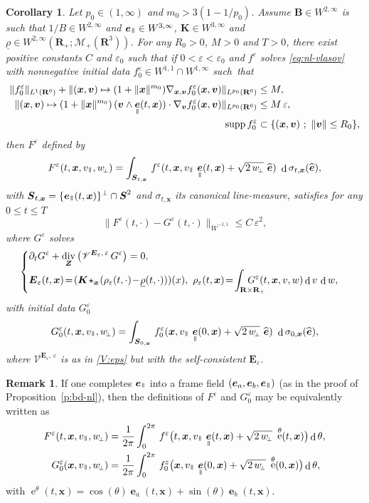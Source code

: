 \documentclass[JEP,XML,SOM,Unicode]{cedram}
\let\mathcal\mathscr
\newenvironment{splitcases}
{\begin{cases}\begin{aligned}}
{\end{aligned}\end{cases}}
\newcommand{\sperp}{{\scriptscriptstyle\perp}}
\newcommand{\sep}{\ ;\ }
\let\eps\varepsilon
\let\d\partial
\DeclareMathOperator\dD{d}\let\dd\dD
\DeclareMathOperator\eD{e}
\DeclareMathOperator{\Div}{div}
\theoremstyle{plain}
\newtheorem{corollary}[theorem]{Corollary}
\theoremstyle{definition}
\newtheorem{remark}[theorem]{Remark}
\newcommand\br{\begin{remark}}
\newcommand\er{\end{remark}}
\newcommand{\be}{\begin{equation}}
\newcommand{\ee}{\end{equation}}
\newcommand{\bc}{\begin{corollary}}
\newcommand{\ec}{\end{corollary}}
\newcommand\R{\mathbf R}
\newcommand\bB{{\boldsymbol B}}
\newcommand\bE{{\boldsymbol E}}
\newcommand\bK{{\boldsymbol K}}
\newcommand\bS{{\boldsymbol S}}
\newcommand\bfv{{\boldsymbol v}}
\newcommand\bfx{{\boldsymbol x}}
\newcommand\bfZ{{\boldsymbol Z}}
\newcommand\urho{{\underline \rho}}
\newcommand\cM{{\mathcal M}}
\newcommand\cV{{\mathcal V}}
\DeclareMathOperator{\beD}{\boldsymbol{e}}
\newcommand\eDpar{\beD_\mypar}
\newcommand\eDa{\beD_a}
\newcommand\eDb{\beD_b}
\newcommand\eperp{w_{\!\sperp}}
\newcommand{\mypar}{{\mkern3mu\vphantom{\perp}\vrule depth 0pt\mkern2mu\vrule depth 0pt\mkern3mu}}
\begin{document}
\bc
\label{cor:2-nl}
Let $p_0\in(1,\infty)$ and $m_0>3(1-1/p_0)$.
Assume $\bB\in W^{2,\infty}$ is such that $1/B\in W^{2,\infty}$ and $\eDpar\in W^{3,\infty}$, $\bK\in W^{3,\infty}$ and $\urho\in W^{2,\infty}(\R_+;\cM_+(\R^3))$. For any $R_0>0$, $M>0$ and $T>0$, there exist positive constants $C$ and $\eps_0$ such that if $0<\eps<\eps_0$ and $f^\eps$ solves \eqref{eq:nl-vlasov} with nonnegative initial data $f_0^\eps\in W^{1,1}\cap W^{1,\infty}$ such~that
\begin{align*}
\|f_0^\eps\|_{L^1(\R^6)}
+\|(\bfx,\bfv)\mapsto (1+\|\bfx\|^{m_0})\nabla_{\bfx,\bfv}f_0^\eps(\bfx,\bfv)\|_{L^{p_0}(\R^6)}&\leq M,\\
\|(\bfx,\bfv)\mapsto (1+\|\bfx\|^{m_0})\,
(\bfv\wedge\eDpar(t,\bfx))\cdot\nabla_{\bfv}f_0^\eps(\bfx,\bfv)\|_{L^{p_0}(\R^6)}&\leq M\,\eps,\\
\operatorname{supp}f_0^\eps&\subset
\{(\bfx,\bfv)\sep \|\bfv\|\leq R_0\},
\end{align*}
then $F^\eps$ defined by
\[
F^\eps(t,\bfx,v_\mypar,\eperp)=\int_{\bS_{t,\bfx}}\,f^\eps(t,\bfx,v_\mypar\,\eDpar(t,\bfx)+\sqrt{2\,\eperp}\ \widehat{\beD})\ \dD \sigma_{t,\bfx}(\widehat{\beD}),
\]
with $\bS_{t,\bfx}=\{\eDpar(t,\bfx)\}^\perp\cap\bS^2$ and $\sigma_{t,\bfx}$ its canonical line-measure, satisfies for any $0\leq t\leq T$
\[
\|F^\eps(t,\cdot)-G^\eps(t,\cdot)\|_{\dot{W}^{-1,1}}\leq C\,\eps^2,
\]
where $G^\eps$ solves
\be
\begin{splitcases}
&\d_t G^\eps+\Div_\bfZ \left(\cV^{\bE_\eps,\,\eps}\,G^\eps \right) =0,\\
&\bE_\eps(t,\bfx)\!=\!(\bK\!\star_{\bfx}\!(\rho_\eps(t,\cdot)\!-\!\urho(t,\cdot)))(x),\ 
\rho_\eps(t,\bfx)\!=\!\int_{\R\times\R_+}\hspace*{-7mm}G^\eps(t,\bfx,v,w)\dD v\,\dD w,
\end{splitcases}
\ee
with initial data $G_{0}^\eps$
\[
G_0^\eps(t,\bfx,v_\mypar,\eperp)=\int_{\bS_{0,\bfx}}\,f_0^\eps(\bfx,v_\mypar\,\eDpar(0,\bfx)+\sqrt{2\,\eperp}\ \widehat{\beD})\ \dD \sigma_{0,\bfx}(\widehat{\beD}),
\]
where $\cV^{\bE_\eps,\,\eps}$ is as in \eqref{V:eps} but with the self-consistent $\bE_\eps$.
\ec

\br If one completes $\eDpar$ into a frame field $(\eDa,\eDb,\eDpar)$ (as in the proof of Proposition~\ref{p:bd-nl}), then the definitions of $F^\eps$ and $G_0^\eps$ may be equivalently written as
\begin{align*}
F^\eps(t,\bfx,v_\mypar,\eperp)&=\frac{1}{2\pi}\int_0^{2\pi}\,f^\eps\bigl(t,\bfx,v_\mypar\,\eDpar(t,\bfx)+\sqrt{2\,\eperp}\ \eD^\theta(t,\bfx)\bigr) \dD \theta,\\
G_0^\eps(\bfx,v_\mypar,\eperp)&=\frac{1}{2\pi}\int_0^{2\pi}\,f_0^\eps\bigl(\bfx,v_\mypar\,\eDpar(0,\bfx)+\sqrt{2\,\eperp}\ \eD^\theta(0,\bfx)\bigr)\dD \theta,
\end{align*}
with $\eD^\theta(t,\bfx)=\cos(\theta)\eDa(t,\bfx)+\sin(\theta)\eDb(t,\bfx)$.
\er
\end{document}
